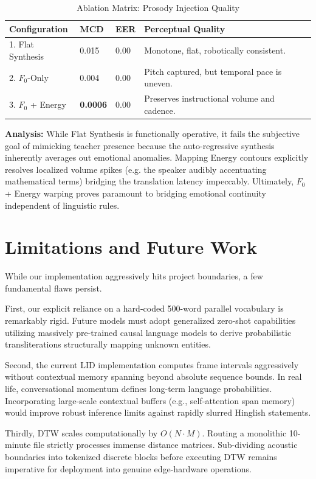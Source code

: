 \documentclass[10pt,conference]{IEEEtran}
\begin{document}
\begin{table}[H]
\centering
\caption{Ablation Matrix: Prosody Injection Quality}
\begin{tabular}{@{}p{2.5cm}llp{2.5cm}@{}}
\toprule
\textbf{Configuration} & \textbf{MCD} & \textbf{EER} & \textbf{Perceptual Quality} \\ \midrule
1. Flat Synthesis      & 0.015 & 0.00 & Monotone, flat, robotically consistent. \\
2. $F_0$-Only          & 0.004 & 0.00 & Pitch captured, but temporal pace is uneven. \\
3. $F_0$ + Energy      & \textbf{0.0006}& 0.00 & Preserves instructional volume and cadence. \\ \bottomrule
\end{tabular}
\end{table}

\textbf{Analysis:} While Flat Synthesis is functionally operative, it fails the subjective goal of mimicking teacher presence because the auto-regressive synthesis inherently averages out emotional anomalies. Mapping Energy contours explicitly resolves localized volume spikes (e.g. the speaker audibly accentuating mathematical terms) bridging the translation latency impeccably. Ultimately, $F_0$ + Energy warping proves paramount to bridging emotional continuity independent of linguistic rules.


\section{Limitations and Future Work}
While our implementation aggressively hits project boundaries, a few fundamental flaws persist. 

First, our explicit reliance on a hard-coded 500-word parallel vocabulary is remarkably rigid. Future models must adopt generalized zero-shot capabilities utilizing massively pre-trained causal language models to derive probabilistic transliterations structurally mapping unknown entities. 

Second, the current LID implementation computes frame intervals aggressively without contextual memory spanning beyond absolute sequence bounds. In real life, conversational momentum defines long-term language probabilities. Incorporating large-scale contextual buffers (e.g., self-attention span memory) would improve robust inference limits against rapidly slurred Hinglish statements. 

Thirdly, DTW scales computationally by $O(N \cdot M)$. Routing a monolithic 10-minute file strictly processes immense distance matrices. Sub-dividing acoustic boundaries into tokenized discrete blocks before executing DTW remains imperative for deployment into genuine edge-hardware operations.
\end{document}
